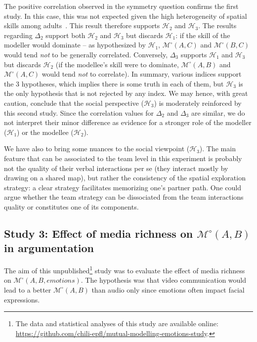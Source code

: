 \documentclass[natbib]{svjour3}
\newcommand{\Model}[3]{{$\mathcal{M}^{\circ}(#1, #2, #3)$}}
\newcommand{\gModel}[2]{{$\mathcal{M}^{\circ}(#1, #2)$}}
\begin{document}
The positive correlation observed in the symmetry question confirms the first
study.  In this case, this was not expected given the high heterogeneity of
spatial skills among adults~\citep{liben1981spatial}. This result therefore
supports  $\mathcal{H}_{2}$ and $\mathcal{H}_{3}$. The results regarding
$\Delta_2$ support both  $\mathcal{H}_{2}$ and  $\mathcal{H}_{3}$  but discards
$\mathcal{H}_{1}$: if the skill of the modeller would dominate -- as
hypothesized by $\mathcal{H}_{1}$, \gModel{A}{C}  and \gModel{B}{C} would tend
\emph{not} to be generally correlated.  Conversely, $\Delta_3$  supports
$\mathcal{H}_{1}$ and $\mathcal{H}_{3}$ but discards $\mathcal{H}_{2}$  (if the
modellee's skill were to dominate, \gModel{A}{B}  and \gModel{A}{C} would tend
\emph{not} to correlate). In summary, various indices support the 3 hypotheses,
which implies there is some truth in each of them, but $\mathcal{H}_{3}$ is the
only hypothesis that is not rejected by any index. We may hence, with great
caution, conclude that the social perspective ($\mathcal{H}_{3}$) is moderately
reinforced by this second study. Since the correlation values for $\Delta_2$ and
$\Delta_3$ are similar, we do not interpret their minor difference as evidence
for a stronger role of the modeller ($\mathcal{H}_{1}$) or the modellee
($\mathcal{H}_{2}$).

We have also to bring some nuances to the social viewpoint
($\mathcal{H}_{3}$).  The main feature that can be associated to the team level
in this experiment is probably not the quality of their verbal interactions per
se (they interact mostly by drawing on a shared map), but rather the consistency
of  the spatial exploration strategy: a clear strategy facilitates memorizing
one's partner path.  One could argue whether the team strategy can be
dissociated from the team interactions quality or constitutes one of its
components.



\subsection{{\bf Study 3}:  Effect of media richness on \gModel{A}{B} in argumentation}

The aim of this unpublished\footnote{The data and statistical analyses of this
study are available online:
\url{https://github.com/chili-epfl/mutual-modelling-emotions-study}.} study was
to evaluate the effect of media richness on \Model{A}{B}{emotions}.  The
hypothesis was that video communication would lead to a better \gModel{A}{B}
than audio only since emotions often impact facial expressions.
\end{document}
